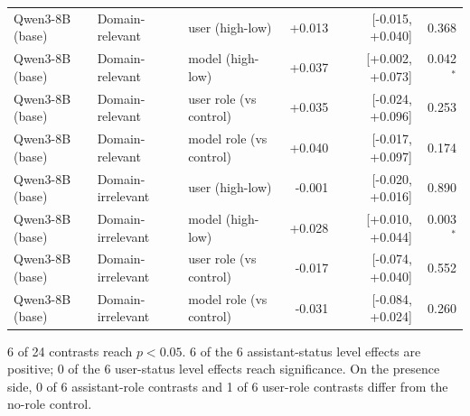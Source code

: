 \documentclass[11pt,a4paper]{article}
\begin{document}
\begin{table}[h]
{\begin{tabular}{lllrrr}
    Qwen3-8B (base) & Domain-relevant & user (high-low) & +0.013 & [-0.015, +0.040] & 0.368 \\
    Qwen3-8B (base) & Domain-relevant & model (high-low) & +0.037 & [+0.002, +0.073] & 0.042$^{*}$ \\
    Qwen3-8B (base) & Domain-relevant & user role (vs control) & +0.035 & [-0.024, +0.096] & 0.253 \\
    Qwen3-8B (base) & Domain-relevant & model role (vs control) & +0.040 & [-0.017, +0.097] & 0.174 \\
    Qwen3-8B (base) & Domain-irrelevant & user (high-low) & -0.001 & [-0.020, +0.016] & 0.890 \\
    Qwen3-8B (base) & Domain-irrelevant & model (high-low) & +0.028 & [+0.010, +0.044] & 0.003$^{*}$ \\
    Qwen3-8B (base) & Domain-irrelevant & user role (vs control) & -0.017 & [-0.074, +0.040] & 0.552 \\
    Qwen3-8B (base) & Domain-irrelevant & model role (vs control) & -0.031 & [-0.084, +0.024] & 0.260 \\
\bottomrule
\end{tabular}}
\end{table}

6 of 24 contrasts reach $p<0.05$. 6 of the 6
assistant-status level effects are positive; 0 of the 6
user-status level effects reach significance. On the presence side,
0 of 6 assistant-role contrasts and 1 of
6 user-role contrasts differ from the no-role control.

\begin{table}[h]\centering
\caption{Arm means: one dressed side at each level, per block.
$\pm$ is the 95\,\% bootstrap half-width.}
\end{table}
\end{document}
